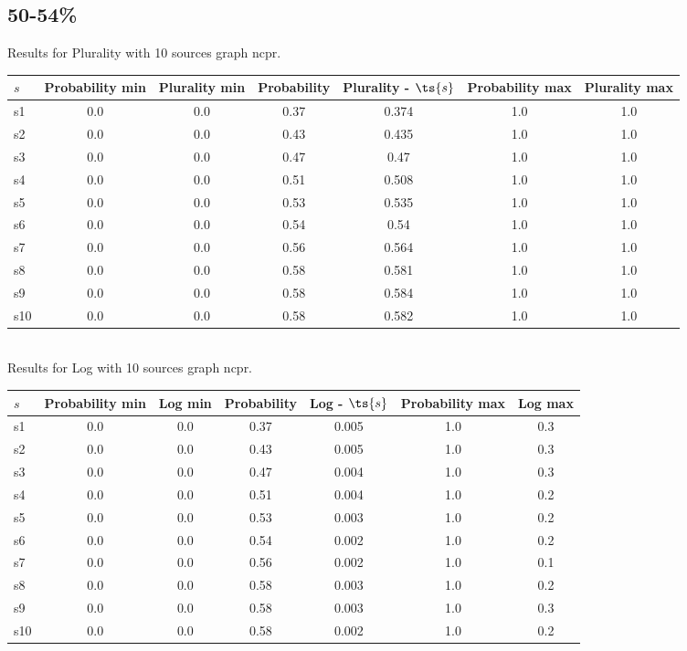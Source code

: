 \documentclass{article}
\begin{document}
\newpage

\subsection{50-54\%}

\noindent Results for Plurality with 10 sources graph ncpr.

\noindent\begin{tabular}{|l|c|c|c|c|c|c|}
\hline
$s$& Probability min & Plurality min & Probability & Plurality - $\ts{s}$ & Probability max & Plurality max\\
\hline
s1 &0.0 & 0.0 & 0.37 & 0.374 & 1.0 & 1.0\\
\hline
s2 &0.0 & 0.0 & 0.43 & 0.435 & 1.0 & 1.0\\
\hline
s3 &0.0 & 0.0 & 0.47 & 0.47 & 1.0 & 1.0\\
\hline
s4 &0.0 & 0.0 & 0.51 & 0.508 & 1.0 & 1.0\\
\hline
s5 &0.0 & 0.0 & 0.53 & 0.535 & 1.0 & 1.0\\
\hline
s6 &0.0 & 0.0 & 0.54 & 0.54 & 1.0 & 1.0\\
\hline
s7 &0.0 & 0.0 & 0.56 & 0.564 & 1.0 & 1.0\\
\hline
s8 &0.0 & 0.0 & 0.58 & 0.581 & 1.0 & 1.0\\
\hline
s9 &0.0 & 0.0 & 0.58 & 0.584 & 1.0 & 1.0\\
\hline
s10 &0.0 & 0.0 & 0.58 & 0.582 & 1.0 & 1.0\\
\hline
\end{tabular}\\

\noindent Results for Log with 10 sources graph ncpr.

\noindent\begin{tabular}{|l|c|c|c|c|c|c|}
\hline
$s$& Probability min & Log min & Probability & Log - $\ts{s}$ & Probability max & Log max\\
\hline
s1 &0.0 & 0.0 & 0.37 & 0.005 & 1.0 & 0.3\\
\hline
s2 &0.0 & 0.0 & 0.43 & 0.005 & 1.0 & 0.3\\
\hline
s3 &0.0 & 0.0 & 0.47 & 0.004 & 1.0 & 0.3\\
\hline
s4 &0.0 & 0.0 & 0.51 & 0.004 & 1.0 & 0.2\\
\hline
s5 &0.0 & 0.0 & 0.53 & 0.003 & 1.0 & 0.2\\
\hline
s6 &0.0 & 0.0 & 0.54 & 0.002 & 1.0 & 0.2\\
\hline
s7 &0.0 & 0.0 & 0.56 & 0.002 & 1.0 & 0.1\\
\hline
s8 &0.0 & 0.0 & 0.58 & 0.003 & 1.0 & 0.2\\
\hline
s9 &0.0 & 0.0 & 0.58 & 0.003 & 1.0 & 0.3\\
\hline
s10 &0.0 & 0.0 & 0.58 & 0.002 & 1.0 & 0.2\\
\hline
\end{tabular}\\
\end{document}
